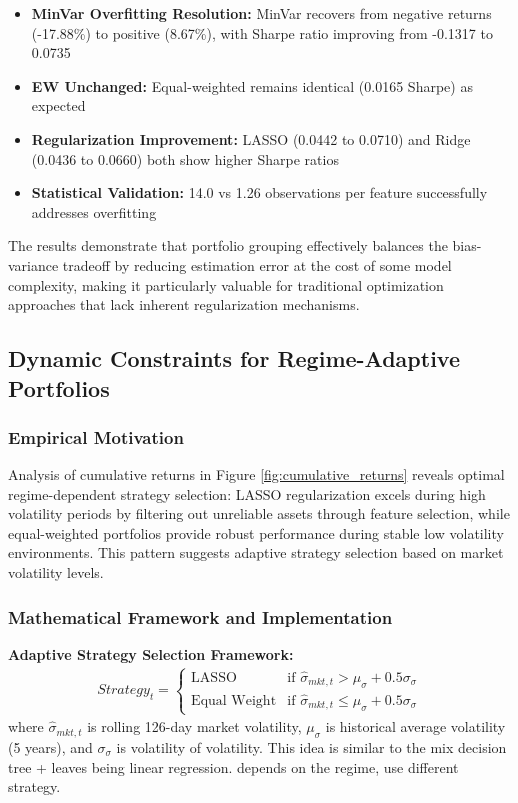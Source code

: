 \documentclass[12pt]{article}
\begin{document}
\begin{itemize}
    \item \textbf{MinVar Overfitting Resolution:} MinVar recovers from negative returns (-17.88\%) to positive (8.67\%), with Sharpe ratio improving from -0.1317 to 0.0735
    \item \textbf{EW Unchanged:} Equal-weighted remains identical (0.0165 Sharpe) as expected
    \item \textbf{Regularization Improvement:} LASSO (0.0442 to 0.0710) and Ridge (0.0436 to 0.0660) both show higher Sharpe ratios
    \item \textbf{Statistical Validation:} 14.0 vs 1.26 observations per feature successfully addresses overfitting
\end{itemize}

The results demonstrate that portfolio grouping effectively balances the bias-variance tradeoff by reducing estimation error at the cost of some model complexity, making it particularly valuable for traditional optimization approaches that lack inherent regularization mechanisms.

\subsection{Dynamic Constraints for Regime-Adaptive Portfolios}

\subsubsection{Empirical Motivation}
Analysis of cumulative returns in Figure \ref{fig:cumulative_returns} reveals optimal regime-dependent strategy selection: LASSO regularization excels during high volatility periods by filtering out unreliable assets through feature selection, while equal-weighted portfolios provide robust performance during stable low volatility environments. This pattern suggests adaptive strategy selection based on market volatility levels.

\subsubsection{Mathematical Framework and Implementation}
\textbf{Adaptive Strategy Selection Framework:}
\begin{align}
Strategy_t = \begin{cases}
\text{LASSO} & \text{if } \hat{\sigma}_{mkt,t} > \mu_{\sigma} + 0.5\sigma_{\sigma} \\
\text{Equal Weight} & \text{if } \hat{\sigma}_{mkt,t} \leq \mu_{\sigma} + 0.5\sigma_{\sigma}
\end{cases}
\end{align}
where $\hat{\sigma}_{mkt,t}$ is rolling 126-day market volatility, $\mu_{\sigma}$ is historical average volatility (5 years), and $\sigma_{\sigma}$ is volatility of volatility. This idea is similar to the mix decision tree + leaves being linear regression. depends on the regime, use different strategy.
\end{document}
